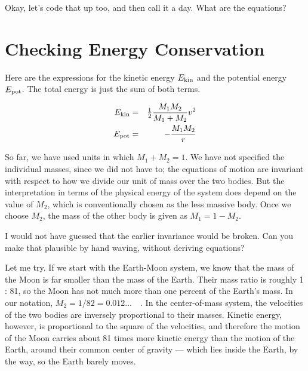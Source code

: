 \carol
Okay, let's code that up too, and then call it a day.  What are the
equations?

\cba

\section{Checking Energy Conservation}

\abc

\alice
Here are the expressions for the kinetic energy $E_{\rm kin}$ and the
potential energy $E_{\rm pot}$.  The total energy is just the sum of
both terms.

\cba

\begin{eqnarray}
E_{\rm kin} & = & \half \frac{M_1 M_2}{M_1 + M_2} v^2 
\label{two-body-E-kin-full} \\
E_{\rm pot} & = & - \frac{M_1 M_2}{r} \label{two-body-E-pot-full}
\end{eqnarray}

\abc

\alice
So far, we have used units in which $M_1 + M_2 = 1$.  We have not
specified the individual masses, since we did not have to; the
equations of motion are invariant with respect to how we divide our
unit of mass over the two bodies.  But the interpretation in terms of
the physical energy of the system does depend on the value of $M_2$,
which is conventionally chosen as the less massive body.  Once we
choose $M_2$, the mass of the other body is given as $M_1 = 1 - M_2$.

\carol
I would not have guessed that the earlier invariance would be broken.
Can you make that plausible by hand waving, without deriving equations?

\bob
Let me try.  If we start with the Earth-Moon system, we know that the
mass of the Moon is far smaller than the mass of the Earth.  Their
mass ratio is roughly 1 : 81, so the Moon has not much more than one
percent of the Earth's mass.  In our notation,
$M_2 = 1/82 = 0.012\dots$\ \ .  In the center-of-mass system, the
velocities of the two bodies are inversely proportional to their
masses.  Kinetic energy, however, is proportional to the square of the
velocities, and therefore the motion of the Moon carries about 81
times more kinetic energy than the motion of the Earth, around their
common center of gravity --- which lies inside the Earth, by the way,
so the Earth barely moves.

